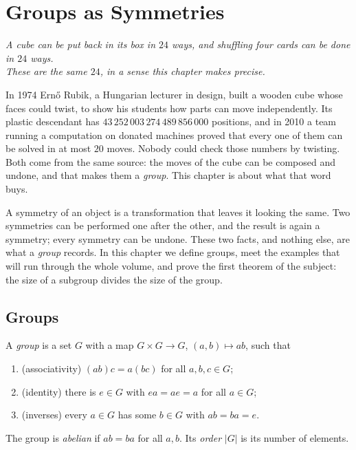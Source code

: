 \chapter{Groups as Symmetries}

\begin{center}\itshape
A cube can be put back in its box in $24$ ways, and shuffling four cards can be done in $24$ ways.\\
These are the same $24$, in a sense this chapter makes precise.
\end{center}

In 1974 Ern\H{o} Rubik, a Hungarian lecturer in design, built a wooden cube whose faces could twist, to show his students how parts can move
independently. Its plastic descendant has $43\,252\,003\,274\,489\,856\,000$ positions, and in 2010 a team running a computation on donated
machines proved that every one of them can be solved in at most $20$ moves. Nobody could check those numbers by twisting. Both come from the
same source: the moves of the cube can be composed and undone, and that makes them a \emph{group}. This chapter is about what that word buys.

A symmetry of an object is a transformation that leaves it looking the same. Two symmetries can be performed one after the other, and the result is again a symmetry; every symmetry can be undone. These two facts, and nothing else, are what a \emph{group} records. In this chapter we define groups, meet the examples that will run through the whole volume, and prove the first theorem of the subject: the size of a subgroup divides the size of the group.

\section{Groups}

\begin{definition}\label{def:group}
A \emph{group} is a set $G$ with a map $G\times G\to G$, $(a,b)\mapsto ab$, such that
\begin{enumerate}[label=(\roman*)]
\item (associativity) $(ab)c=a(bc)$ for all $a,b,c\in G$;
\item (identity) there is $e\in G$ with $ea=ae=a$ for all $a\in G$;
\item (inverses) every $a\in G$ has some $b\in G$ with $ab=ba=e$.
\end{enumerate}
The group is \emph{abelian} if $ab=ba$ for all $a,b$. Its \emph{order} $|G|$ is its number of elements.
\end{definition}

